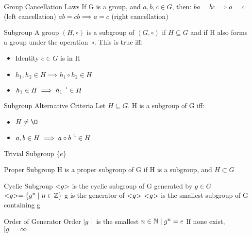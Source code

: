 \begin{flashcard}[Definition]{Group Cancellation Laws}
  If G is a group, and $a,b,c \in G$, then:
  \vfill
  $ba = bc \implies a = c$ (left cancellation)
  \vfill
  $ab = cb \implies a = c$ (right cancellation)
\end{flashcard}

\begin{flashcard}[Definition]{Subgroup}
  A group $(H, \circ)$ is a subgroup of $(G, \circ)$ if $H \subseteq G$ and if H also forms a group under the operation~$\circ$. This is true iff:
  \vfill
  \begin{itemize}
   \item Identity $e \in G$ is in H
   \item $h_1,h_2 \in H \implies h_1 \circ h_2 \in H$
   \item $h_1 \in H \implies \inv{h_1} \in H$
  \end{itemize}
\end{flashcard}

\begin{flashcard}[Definition]{Subgroup Alternative Criteria}
  Let $H \subseteq G$. H is a subgroup of G iff:
  \vfill
  \begin{itemize}
   \item $H \neq \O$
   \item $a,b \in H \implies a \circ \inv{b} \in H$
  \end{itemize}
\end{flashcard}

\begin{flashcard}[Definition]{Trivial Subgroup}
  $\{e\}$
\end{flashcard}

\begin{flashcard}[Definition]{Proper Subgroup}
  H is a proper subgroup of G if H is a subgroup, and $H \subset G$
\end{flashcard}

\begin{flashcard}[Definition]{Cyclic Subgroup}
  $< \negthickspace g \negthickspace >$ is the cyclic subgroup of G generated by $g \in G$
  \vfill
  $< \negthickspace g \negthickspace > = \{ g^n \mid n \in \mathbb{Z} \}$
  \vfill
  g is the generator of $< \negthickspace g \negthickspace >$
  \vfill
  $< \negthickspace g \negthickspace >$ is the smallest subgroup of G containing g
\end{flashcard}

\begin{flashcard}[Definition]{Order of Generator}
  Order $\mid{g}\mid$ is the smallest $n \in \mathbb{N} \mid g^n = e$
  \vfill
  If none exist, $\mid{g}\mid = \infty$
\end{flashcard}

